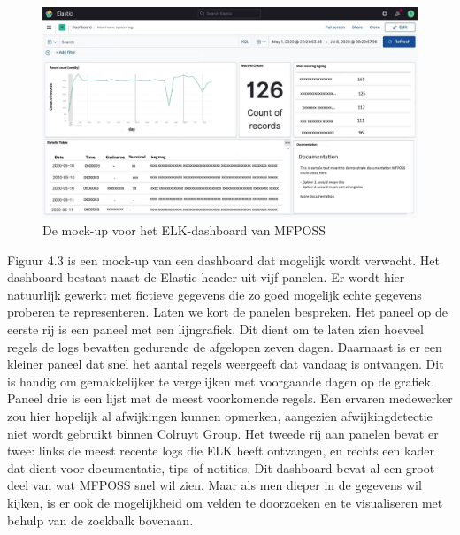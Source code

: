 \begin{figure}[h]
    \centering
    \includegraphics[width=1\linewidth]{bachproef//graphics/Dashboard_mockup.png}
    \caption{De mock-up voor het ELK-dashboard van MFPOSS}
    \label{fig: De mock-up voor het ELK-dashboard van MFPOSS}
\end{figure}

Figuur 4.3 is een mock-up van een dashboard dat mogelijk wordt verwacht. Het dashboard bestaat naast de Elastic-header uit vijf panelen. Er wordt hier natuurlijk gewerkt met fictieve gegevens die zo goed mogelijk echte gegevens proberen te representeren. Laten we kort de panelen bespreken. Het paneel op de eerste rij is een paneel met een lijngrafiek. Dit dient om te laten zien hoeveel regels de logs bevatten gedurende de afgelopen zeven dagen. Daarnaast is er een kleiner paneel dat snel het aantal regels weergeeft dat vandaag is ontvangen. Dit is handig om gemakkelijker te vergelijken met voorgaande dagen op de grafiek. Paneel drie is een lijst met de meest voorkomende regels. Een ervaren medewerker zou hier hopelijk al afwijkingen kunnen opmerken, aangezien afwijkingdetectie niet wordt gebruikt binnen Colruyt Group. Het tweede rij aan panelen bevat er twee: links de meest recente logs die ELK heeft ontvangen, en rechts een kader dat dient voor documentatie, tips of notities. Dit dashboard bevat al een groot deel van wat MFPOSS snel wil zien. Maar als men dieper in de gegevens wil kijken, is er ook de mogelijkheid om velden te doorzoeken en te visualiseren met behulp van de zoekbalk bovenaan.


